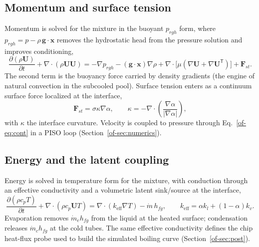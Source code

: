 \documentclass[11pt]{article}
\begin{document}
\subsection{Momentum and surface tension}
Momentum is solved for the mixture in the buoyant $p_{rgh}$ form, where
$p_{rgh}=p-\rho\,\mathbf g\!\cdot\!\mathbf x$ removes the hydrostatic head from the
pressure solution and improves conditioning,
\begin{equation}
\frac{\partial(\rho\mathbf U)}{\partial t}+\nabla\!\cdot(\rho\mathbf U\mathbf U)
=-\nabla p_{rgh}-(\mathbf g\!\cdot\!\mathbf x)\nabla\rho
+\nabla\!\cdot\!\big[\mu(\nabla\mathbf U+\nabla\mathbf U^{\mathsf T})\big]
+\mathbf F_{st}.
\label{of-eq:mom}
\end{equation}
The second term is the buoyancy force carried by density gradients (the engine of natural
convection in the subcooled pool). Surface tension enters as a continuum surface force
\cite{of-brackbill1992} localized at the interface,
\begin{equation}
\mathbf F_{st}=\sigma\kappa\nabla\alpha,\qquad
\kappa=-\nabla\!\cdot\!\left(\frac{\nabla\alpha}{|\nabla\alpha|}\right),
\end{equation}
with $\kappa$ the interface curvature. Velocity is coupled to pressure through
Eq.~\eqref{of-eq:cont} in a PISO loop (Section~\ref{of-sec:numerics}).

\subsection{Energy and the latent coupling}
Energy is solved in temperature form for the mixture, with conduction through an effective
conductivity and a volumetric latent sink/source at the interface,
\begin{equation}
\frac{\partial(\rho c_p T)}{\partial t}+\nabla\!\cdot(\rho c_p\mathbf U T)
=\nabla\!\cdot(k_{\mathrm{eff}}\nabla T)-\dot m\,h_{fg},
\qquad
k_{\mathrm{eff}}=\alpha k_l+(1-\alpha)k_v.
\label{of-eq:energy}
\end{equation}
Evaporation removes $\dot m_e h_{fg}$ from the liquid at the heated surface; condensation
releases $\dot m_c h_{fg}$ at the cold tubes. The same effective conductivity defines the
chip heat-flux probe used to build the simulated boiling curve (Section~\ref{of-sec:post}).
\end{document}
